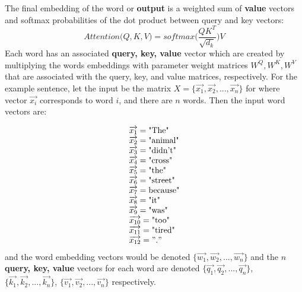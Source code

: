 The final embedding of the word or \textbf{output} is a weighted sum of \textbf{value} vectors and softmax probabilities of the dot product between query and key vectors: 
$$
Attention \Big(Q, K, V \Big) = softmax \Bigg(\frac {QK^T} {\sqrt{d_k}} \Bigg) V
$$
Each word has an associated \textbf{query, key, value} vector which are created by multiplying the words embeddings with parameter weight matrices $W^Q, W^K, W^V$ that are associated with the query, key, and value matrices, respectively. For the example sentence, let the input be the matrix $X = \{\overrightarrow{x_1}, \overrightarrow{x_2}, ..., \overrightarrow{x_n}\}$ for where vector $\overrightarrow{x_i}$ corresponds to word $i$, and there are $n$ words. Then the input word vectors are: 

$$
\begin{array}{ll}
\overrightarrow{x_1} = \text{"The"} \\
\overrightarrow{x_2} = \text{"animal"} \\
\overrightarrow{x_3} = \text{"didn't"} \\
\overrightarrow{x_4} = \text{"cross"} \\
\overrightarrow{x_5} = \text{"the"} \\
\overrightarrow{x_6} = \text{"street"} \\
\overrightarrow{x_7} = \text{because"} \\
\overrightarrow{x_8} = \text{"it"} \\
\overrightarrow{x_9} = \text{"was"} \\
\overrightarrow{x_{10}} = \text{"too"} \\
\overrightarrow{x_{11}} = \text{"tired"} \\
\overrightarrow{x_{12}} = "." \\
\end{array}
$$
and the word embedding vectors would be denoted $\Big\{ \overrightarrow{w_1}, \overrightarrow{w_2}, ..., \overrightarrow{w_n} \Big\}$ and the $n$ \textbf{query, key, value} vectors for each word are denoted $\Big\{\overrightarrow{q_1}, \overrightarrow{q_2}, ..., \overrightarrow{q_n} \Big\}$, $\Big\{\overrightarrow{k_1}, \overrightarrow{k_2}, ..., \overrightarrow{k_n} \Big\}$, $\Big\{\overrightarrow{v_1}, \overrightarrow{v_2}, ..., \overrightarrow{v_n} \Big\}$ respectively.


